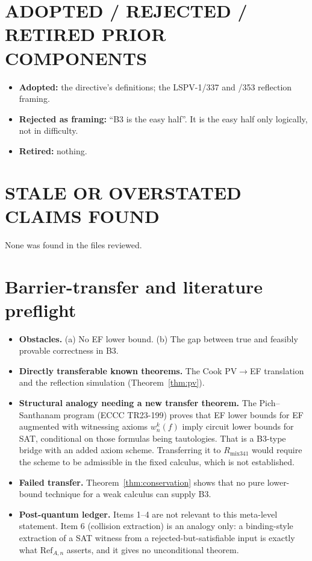\documentclass[11pt]{article}
\theoremstyle{definition}
\begin{document}
\section*{ADOPTED / REJECTED / RETIRED PRIOR COMPONENTS}
\begin{itemize}
\item \textbf{Adopted:} the directive's definitions; the LSPV-1/337 and /353 reflection framing.
\item \textbf{Rejected as framing:} ``B3 is the easy half''. It is the easy half only logically, not in difficulty.
\item \textbf{Retired:} nothing.
\end{itemize}

\section*{STALE OR OVERSTATED CLAIMS FOUND}
None was found in the files reviewed.

\section*{Barrier-transfer and literature preflight}
\begin{itemize}
\item \textbf{Obstacles.} (a) No EF lower bound. (b) The gap between true and feasibly provable correctness in B3.
\item \textbf{Directly transferable known theorems.} The Cook $\mathrm{PV}\to$EF translation and the reflection simulation (Theorem~\ref{thm:pv}).
\item \textbf{Structural analogy needing a new transfer theorem.} The Pich--Santhanam program (ECCC TR23-199) proves that EF lower bounds for EF augmented with witnessing axioms $w^k_n(f)$ imply circuit lower bounds for SAT, conditional on those formulas being tautologies.
That is a B3-type bridge with an added axiom scheme.
Transferring it to $R_{\mathrm{mix341}}$ would require the scheme to be admissible in the fixed calculus, which is not established.
\item \textbf{Failed transfer.} Theorem~\ref{thm:conservation} shows that no pure lower-bound technique for a weak calculus can supply B3.
\item \textbf{Post-quantum ledger.} Items 1--4 are not relevant to this meta-level statement.
Item 6 (collision extraction) is an analogy only: a binding-style extraction of a SAT witness from a rejected-but-satisfiable input is exactly what $\mathrm{Ref}_{A,n}$ asserts, and it gives no unconditional theorem.
\end{itemize}
\end{document}
